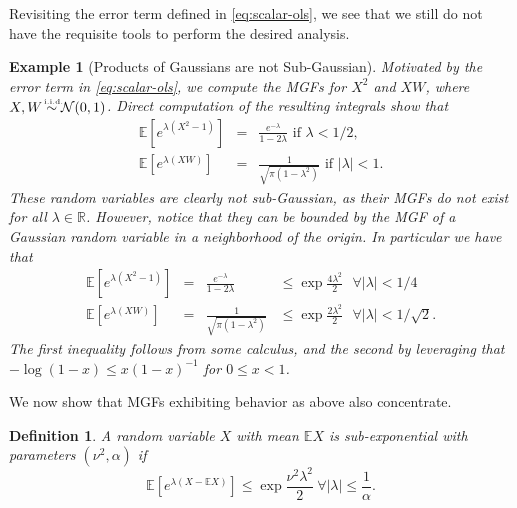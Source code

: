 \documentclass{article}[12pt]
\newtheorem{defn}{Definition}
\newtheorem{ex}{Example}
\def\R{\mathbf{R}}
\def\E{\mathbb{E}}
\def \E{\mathbb E}
\def \R{\mathbb R}
\begin{document}
 Revisiting the error term defined in \eqref{eq:scalar-ols}, we see that we still do not have the requisite tools to perform the desired analysis.

\begin{ex}[Products of Gaussians are not Sub-Gaussian]
Motivated by the error term in \eqref{eq:scalar-ols}, we compute the MGFs for $X^2$ and $XW$, where $X,W\iid \Normal(0,1)$.  Direct computation of the resulting integrals show that
\begin{equation}
\begin{array}{rcl}
\E\left[e^{\lambda(X^2-1)}\right] &=& \frac{e^{-\lambda}}{1-2\lambda}\text{ if $\lambda < 1/2$,} \\
\E\left[e^{\lambda(XW)}\right] &=& \frac{1}{\sqrt{\pi(1-\lambda^2)}}\text{ if $|\lambda|<1$}.
\end{array}
\label{eq:mgfs-for-scalar}
\end{equation}
 These random variables are clearly not sub-Gaussian, as their MGFs do not exist for all $\lambda \in \R$.  However, notice that they can be bounded by the MGF of a Gaussian random variable in a neighborhood of the origin.  In particular we have that
\begin{equation*}
\begin{array}{rcll}
\E\left[e^{\lambda(X^2-1)}\right] &=& \frac{e^{-\lambda}}{1-2\lambda} &\leq \exp{\frac{4\lambda^2}{2}}\text{ $\forall |\lambda| < 1/4$} \\
\E\left[e^{\lambda(XW)}\right] &=& \frac{1}{\sqrt{\pi(1-\lambda^2)}} & \leq \exp{\frac{2\lambda^2}{2}}\text{ $\forall |\lambda|<1/\sqrt{2}$}.
\end{array}
\label{eq:subexp-example}
\end{equation*}
The first inequality follows from some calculus, and the second by leveraging that $-\log(1-x)\leq x(1-x)^{-1}$ for $0 \leq x <1$.
\label{ex:chi-squared}
\end{ex}
 
 
 We now show that MGFs exhibiting behavior as above also concentrate.

\begin{defn}
A random variable $X$ with mean $\E X$ is sub-exponential with parameters $(\nu^2, \alpha)$ if
\begin{equation}
\E\left[e^{\lambda(X-\E X)}\right] \leq \exp{\frac{\nu^2\lambda^2}{2}} \ \forall |\lambda| \leq \frac{1}{\alpha}.
\end{equation}
\label{def:subexp}
\end{defn}
\end{document}
